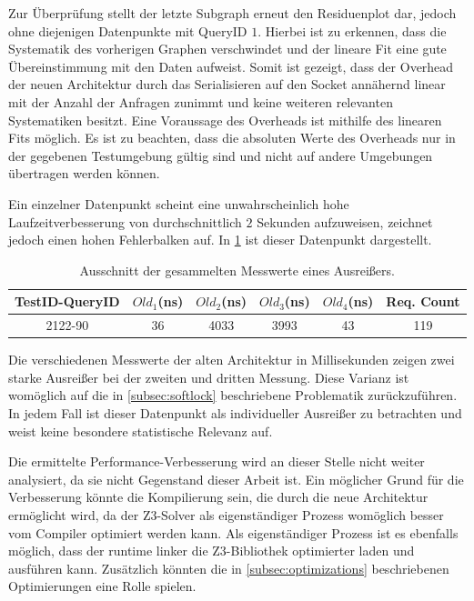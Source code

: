 Zur Überprüfung stellt der letzte Subgraph erneut den Residuenplot dar, jedoch ohne diejenigen Datenpunkte mit QueryID $1$.
Hierbei ist zu erkennen, dass die Systematik des vorherigen Graphen verschwindet und der lineare Fit eine gute Übereinstimmung mit den Daten aufweist.
Somit ist gezeigt, dass der Overhead der neuen Architektur durch das Serialisieren auf den Socket annähernd linear mit der Anzahl der Anfragen zunimmt
und keine weiteren relevanten Systematiken besitzt. Eine Voraussage des Overheads ist mithilfe des linearen Fits möglich.
Es ist zu beachten, dass die absoluten Werte des Overheads nur in der gegebenen Testumgebung gültig sind und nicht auf andere Umgebungen übertragen werden können.

Ein einzelner Datenpunkt scheint eine unwahrscheinlich hohe Laufzeitverbesserung von durchschnittlich $2$ Sekunden aufzuweisen, zeichnet jedoch einen hohen Fehlerbalken auf.
In \cref{tab:broken-datapoint} ist dieser Datenpunkt dargestellt.

\begin{table}[!htp]
    \centering
    \caption{Ausschnitt der gesammelten Messwerte eines Ausreißers.}
    \label{tab:broken-datapoint}
    \begin{tabular}{ cccccc }
        \toprule
        \textbf{TestID-QueryID} & \textbf{$Old_1$(ns)} & \textbf{$Old_2$(ns)} & \textbf{$Old_3$(ns)} & \textbf{$Old_4$(ns)} & \textbf{Req. Count} \\
        \midrule
        2122-90                 & 36                   & 4033                 & 3993                 & 43                   & 119                 \\
        \bottomrule
    \end{tabular}
\end{table}
\FloatBarrier

Die verschiedenen Messwerte der alten Architektur in Millisekunden zeigen zwei starke Ausreißer bei der zweiten und dritten Messung.
Diese Varianz ist womöglich auf die in \cref{subsec:softlock} beschriebene Problematik zurückzuführen.
In jedem Fall ist dieser Datenpunkt als individueller Ausreißer zu betrachten und weist keine besondere statistische Relevanz auf.

Die ermittelte Performance-Verbesserung wird an dieser Stelle nicht weiter analysiert, da sie nicht Gegenstand dieser Arbeit ist.
Ein möglicher Grund für die Verbesserung könnte die Kompilierung sein, die durch die neue Architektur ermöglicht wird,
da der Z3-Solver als eigenständiger Prozess womöglich besser vom Compiler optimiert werden kann.
Als eigenständiger Prozess ist es ebenfalls möglich, dass der runtime linker die Z3-Bibliothek optimierter laden und ausführen kann.
Zusätzlich könnten die in \cref{subsec:optimizations} beschriebenen Optimierungen eine Rolle spielen.
